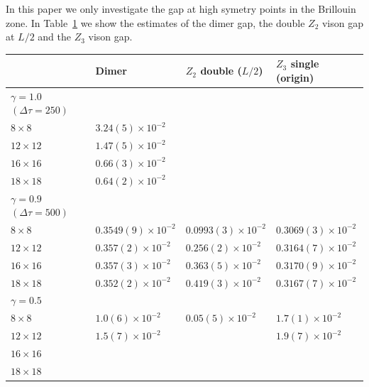 \documentclass[twocolumn,prb,aps,floatfix,superscriptaddress]{revtex4-1}
\begin{document}

    In this paper we only investigate the gap at high symetry points in the Brillouin zone. 
    In Table~\ref{tab:gap_table} we show the estimates of the dimer gap, the double $Z_2$ vison gap
    at $L/2$ and the $Z_3$ vison gap.
    \begin{table}[htpb]
    \setlength\tabcolsep{0.3cm}
        \centering
        \label{tab:gap_table}
        \begin{tabular}{l l l l}
            \hline\hline
                        & Dimer                 & $Z_2$ double ($L/2$)  &  $Z_3$ single (origin)     \\   
            \hline
            $\gamma=1.0$ $(\Delta \tau =250)$    &  &  & \\
            $8\times8$  & $3.24(5)\times10^{-2}$ &                       &                            \\
            $12\times12$& $1.47(5)\times10^{-2}$ &                       &                            \\
            $16\times16$& $0.66(3)\times10^{-2}$ &                       &                            \\
            $18\times18$& $0.64(2)\times10^{-2}$ &                       &                            \\
            \hline
            $\gamma=0.9$ $(\Delta \tau =500)$    &  &  & \\
            $8\times8$  & $0.3549(9)\times10^{-2}$&$0.0993(3)\times10^{-2}$& $0.3069(3)\times10^{-2}$     \\
            $12\times12$& $0.357(2)\times10^{-2} $&$0.256(2)\times10^{-2} $ & $0.3164(7)\times10^{-2}$    \\
            $16\times16$& $0.357(3)\times10^{-2} $&$0.363(5)\times10^{-2} $ & $0.3170(9)\times10^{-2}$    \\
            $18\times18$& $0.352(2)\times10^{-2} $&$0.419(3)\times10^{-2} $ & $0.3167(7)\times10^{-2}$    \\
            \hline
            $\gamma=0.5$    & & & \\
            $8\times8$  & $1.0(6)\times10^{-2}$ &$0.05(5)\times10^{-2}$ & $1.7(1)\times10^{-2}$     \\
            $12\times12$& $1.5(7)\times10^{-2}$ &                       & $1.9(7)\times10^{-2}$      \\
            $16\times16$&                       &                       &                            \\
            $18\times18$&                       &                       &                            \\
        \end{tabular}
    \end{table}
\end{document}
